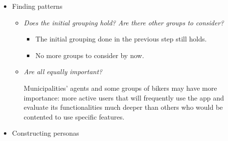 \documentclass[10pt,a4paper]{article} %
\begin{document}
 
   
   \begin{itemize}
   
\item Finding patterns
 \begin{itemize}
 \item  	 	\textit{Does the initial grouping hold? Are there other groups to consider?}
\begin{itemize}
 \item  The initial grouping done in the previous step still holds.
 \item No more groups to consider by now.
\end{itemize} 
 \item  	\textit{Are all equally important?}
 
 Municipalities’ agents and some groups of bikers may have more importance:  more active users that will frequently use the app and evaluate its functionalities much deeper than others who would be contented to use specific features.
 
   \end{itemize} 
   
   
  \item Constructing personas
   

\end{itemize}
\end{document}
